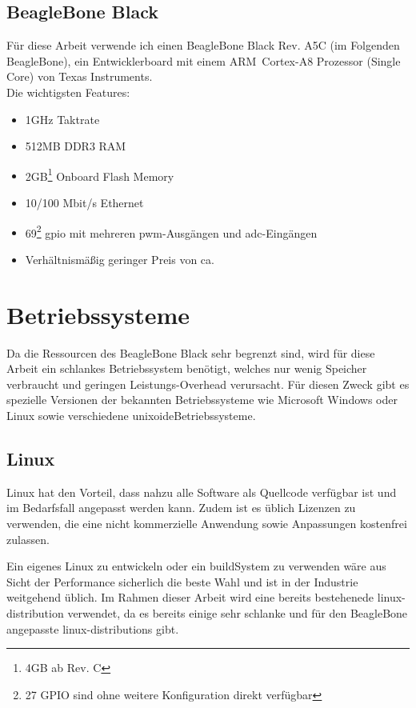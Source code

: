 \subsection{BeagleBone Black}
Für diese Arbeit verwende ich einen BeagleBone Black Rev. A5C (im Folgenden BeagleBone), ein Entwicklerboard mit einem ARM\textregistered ~Cortex\texttrademark -A8 Prozessor (Single Core) von Texas Instruments.\\

\noindent Die wichtigsten Features:
\begin{itemize}
\item 1GHz Taktrate
\item 512MB DDR3 RAM
\item 2GB\footnote{4GB ab Rev. C} Onboard Flash Memory
\item 10/100 Mbit/s Ethernet
\item 69\footnote{27 GPIO sind ohne weitere Konfiguration direkt verfügbar} \gls{gpio} mit mehreren \gls{pwm}-Ausgängen und \gls{adc}-Eingängen
\item Verhältnismäßig geringer Preis von ca. 
\end{itemize}


\section{Betriebssysteme}
Da die Ressourcen des BeagleBone Black sehr begrenzt sind, wird für diese Arbeit ein schlankes Betriebssystem benötigt, welches nur wenig Speicher verbraucht und geringen Leistungs-Overhead verursacht. Für diesen Zweck gibt es spezielle Versionen der bekannten Betriebssysteme wie Microsoft Windows oder Linux sowie verschiedene \gls{unixoideBetriebssysteme}.


\subsection{Linux}
Linux hat den Vorteil, dass nahzu alle Software als Quellcode verfügbar ist und im Bedarfsfall angepasst werden kann. Zudem ist es üblich Lizenzen zu verwenden, die eine nicht kommerzielle Anwendung sowie Anpassungen kostenfrei zulassen.

Ein eigenes Linux zu entwickeln oder ein \gls{buildSystem} zu verwenden wäre aus Sicht der Performance sicherlich die beste Wahl und ist in der Industrie weitgehend üblich. Im Rahmen dieser Arbeit wird eine bereits bestehenede \gls{linux-distribution} verwendet, da es bereits einige sehr schlanke und für den BeagleBone angepasste \glspl{linux-distribution} gibt.


